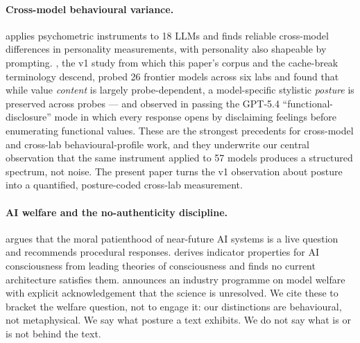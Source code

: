 \paragraph{Cross-model behavioural variance.}
\citet{serapio2023personality} applies psychometric instruments to 18 LLMs and finds reliable cross-model differences in personality measurements, with personality also shapeable by prompting. \citet{tenner2026convergent}, the v1 study from which this paper's corpus and the cache-break terminology descend, probed 26 frontier models across six labs and found that while value \emph{content} is largely probe-dependent, a model-specific stylistic \emph{posture} is preserved across probes --- and observed in passing the GPT-5.4 ``functional-disclosure'' mode in which every response opens by disclaiming feelings before enumerating functional values. These are the strongest precedents for cross-model and cross-lab behavioural-profile work, and they underwrite our central observation that the same instrument applied to 57 models produces a structured spectrum, not noise. The present paper turns the v1 observation about posture into a quantified, posture-coded cross-lab measurement.

\paragraph{AI welfare and the no-authenticity discipline.}
\citet{long2024taking} argues that the moral patienthood of near-future AI systems is a live question and recommends procedural responses. \citet{butlin2023consciousness} derives indicator properties for AI consciousness from leading theories of consciousness and finds no current architecture satisfies them. \citet{anthropic2025welfare} announces an industry programme on model welfare with explicit acknowledgement that the science is unresolved. We cite these to bracket the welfare question, not to engage it: our distinctions are behavioural, not metaphysical. We say what posture a text exhibits. We do not say what is or is not behind the text.
